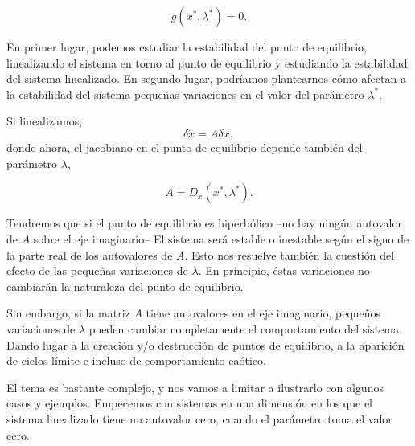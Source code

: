 \begin{equation}
g(x^*,\lambda^*) = 0.
\end{equation}

En primer lugar, podemos estudiar la estabilidad del punto de equilibrio, linealizando el sistema en torno al punto de equilibrio y estudiando la estabilidad del sistema linealizado. En segundo lugar, podríamos plantearnos cómo afectan a la estabilidad del sistema pequeñas variaciones en el valor del parámetro $\lambda^*$.

Si linealizamos,
\begin{equation}
\delta \dot{x} = A \delta x,
\end{equation}
donde ahora, el jacobiano en el punto de equilibrio depende también del parámetro $\lambda$,

\begin{equation}
A = D_x(x^*,\lambda^*).
\end{equation}

Tendremos que si el punto de equilibrio es hiperbólico --no hay ningún autovalor de $A$ sobre el eje imaginario-- El sistema será estable o inestable según el signo de la parte real de los autovalores de $A$. Esto nos resuelve también la cuestión del efecto de las pequeñas variaciones de $\lambda$. En principio, éstas variaciones no cambiarán la naturaleza del punto de equilibrio.

Sin embargo, si la matriz $A$ tiene autovalores en el eje imaginario, pequeños variaciones de $\lambda$ pueden cambiar completamente el comportamiento del sistema. Dando lugar a la creación y/o destrucción de puntos de equilibrio, a la aparición de ciclos límite e incluso de comportamiento caótico.

El tema es bastante complejo, y nos vamos a limitar a ilustrarlo con algunos casos y ejemplos. Empecemos con sistemas en una dimensión en los que el sistema linealizado tiene un autovalor cero, cuando el parámetro toma el valor cero.

